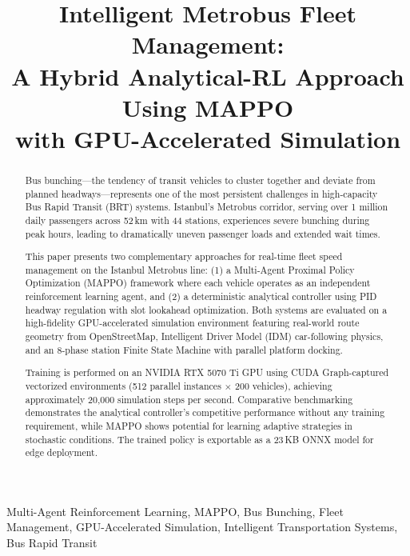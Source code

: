 \documentclass[conference]{IEEEtran}
\begin{document}
\title{Intelligent Metrobus Fleet Management:\\
A Hybrid Analytical-RL Approach Using MAPPO\\
with GPU-Accelerated Simulation}

\author{
}

\maketitle

\begin{abstract}
Bus bunching---the tendency of transit vehicles to cluster together and deviate from planned headways---represents one of the most persistent challenges in high-capacity Bus Rapid Transit (BRT) systems. Istanbul's Metrobus corridor, serving over 1 million daily passengers across 52\,km with 44 stations, experiences severe bunching during peak hours, leading to dramatically uneven passenger loads and extended wait times.

This paper presents two complementary approaches for real-time fleet speed management on the Istanbul Metrobus line: (1) a Multi-Agent Proximal Policy Optimization (MAPPO) framework where each vehicle operates as an independent reinforcement learning agent, and (2) a deterministic analytical controller using PID headway regulation with slot lookahead optimization. Both systems are evaluated on a high-fidelity GPU-accelerated simulation environment featuring real-world route geometry from OpenStreetMap, Intelligent Driver Model (IDM) car-following physics, and an 8-phase station Finite State Machine with parallel platform docking.

Training is performed on an NVIDIA RTX 5070 Ti GPU using CUDA Graph-captured vectorized environments (512 parallel instances $\times$ 200 vehicles), achieving approximately 20,000 simulation steps per second. Comparative benchmarking demonstrates the analytical controller's competitive performance without any training requirement, while MAPPO shows potential for learning adaptive strategies in stochastic conditions. The trained policy is exportable as a 23\,KB ONNX model for edge deployment.
\end{abstract}

\begin{IEEEkeywords}
Multi-Agent Reinforcement Learning, MAPPO, Bus Bunching, Fleet Management, GPU-Accelerated Simulation, Intelligent Transportation Systems, Bus Rapid Transit
\end{IEEEkeywords}
\end{document}
